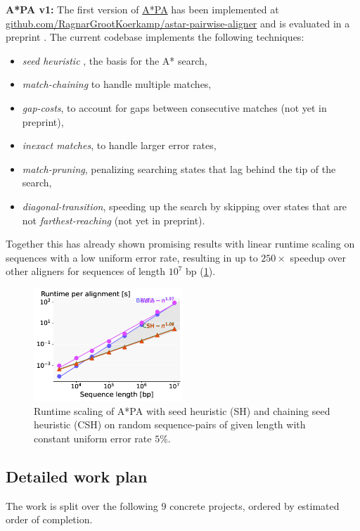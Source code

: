 \documentclass[11pt,english,a4paper]{article}
\begin{document}
\textbf{A*PA v1:}
The first version of \href{https://github.com/RagnarGrootKoerkamp/astar-pairwise-aligner}{A*PA} has been implemented at
\href{https://github.com/RagnarGrootKoerkamp/astar-pairwise-aligner}{github.com/RagnarGrootKoerkamp/astar-pairwise-aligner} and is evaluated
in a preprint \autocite{astarpa}.
The current codebase implements the following techniques:
\begin{itemize}
\item \emph{seed heuristic} \autocite{astarix-2}, the basis for the A* search,
\item \emph{match-chaining} to handle multiple matches,
\item \emph{gap-costs}, to account for gaps between consecutive matches (not yet in preprint),
\item \emph{inexact matches}, to handle larger error rates,
\item \emph{match-pruning}, penalizing searching states that lag behind the tip of the search,
\item \emph{diagonal-transition}, speeding up the search by skipping over states that are
not \emph{farthest-reaching} (not yet in preprint).
\end{itemize}

Together this has already shown promising results with linear runtime scaling
on sequences with a low uniform error rate, resulting in up to \(250\times\) speedup over
other aligners for sequences of length \(10^7\) bp (\ref{scaling}).

\begin{figure}[h]
\centering
\includegraphics[width=0.5\textwidth]{scaling.png}
\caption{\label{scaling}Runtime scaling of A*PA with seed heuristic (SH) and chaining seed heuristic (CSH) on random sequence-pairs of given length with constant uniform error rate \(5\%\).}
\end{figure}

\subsection{Detailed work plan}
\label{sec:orgfbb2d6a}
The work is split over the following \(9\) concrete projects, ordered by
estimated order of completion.
\end{document}
